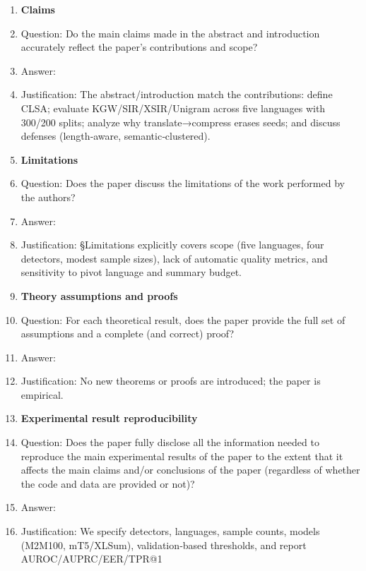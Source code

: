 \documentclass{article}
\begin{document}
\begin{enumerate}

\item {\bf Claims}
    \item[] Question: Do the main claims made in the abstract and introduction accurately reflect the paper's contributions and scope?
    \item[] Answer: \answerYes{}
    \item[] Justification: The abstract/introduction match the contributions: define CLSA; evaluate KGW/SIR/XSIR/Unigram across five languages with 300/200 splits; analyze why translate→compress erases seeds; and discuss defenses (length‑aware, semantic‑clustered).

\item {\bf Limitations}
    \item[] Question: Does the paper discuss the limitations of the work performed by the authors?
    \item[] Answer: \answerYes{}
    \item[] Justification: §Limitations explicitly covers scope (five languages, four detectors, modest sample sizes), lack of automatic quality metrics, and sensitivity to pivot language and summary budget.

\item {\bf Theory assumptions and proofs}
    \item[] Question: For each theoretical result, does the paper provide the full set of assumptions and a complete (and correct) proof?
    \item[] Answer: \answerNA{}
    \item[] Justification: No new theorems or proofs are introduced; the paper is empirical.

    \item {\bf Experimental result reproducibility}
    \item[] Question: Does the paper fully disclose all the information needed to reproduce the main experimental results of the paper to the extent that it affects the main claims and/or conclusions of the paper (regardless of whether the code and data are provided or not)?
    \item[] Answer: \answerYes{}
    \item[] Justification: We specify detectors, languages, sample counts, models (M2M100, mT5/XLSum), validation‑based thresholds, and report AUROC/AUPRC/EER/TPR@1%



\end{enumerate}
\end{document}
